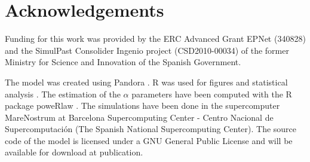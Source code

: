 \documentclass{wscpaperproc}
\begin{document}
\section{Acknowledgements}

Funding for this work was provided by the ERC Advanced Grant EPNet (340828) and the SimulPast Consolider Ingenio project (CSD2010-00034) of the former Ministry for Science and Innovation of the Spanish Government. 

The model was created using Pandora \cite{rubiocampillo_2014}. R was used for figures and statistical analysis \cite{rdev_2012}. The estimation of the $\alpha$ parameters have been computed with the R package poweRlaw \cite{gillespie_fitting_2015}. The simulations have been done in the supercomputer MareNostrum at Barcelona Supercomputing Center - Centro Nacional de Supercomputación (The Spanish National Supercomputing Center). The source code of the model is licensed under a GNU General Public License and will be available for download at publication.


  
\end{document}
